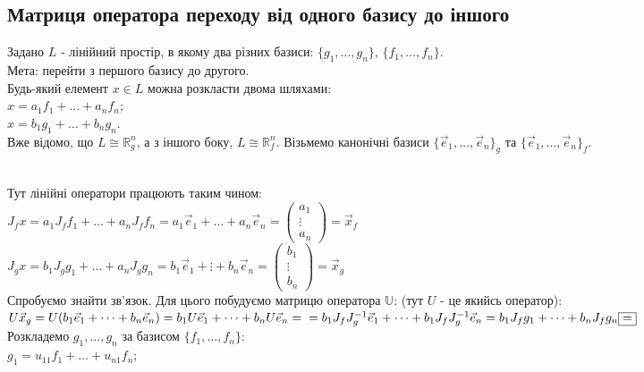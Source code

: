\documentclass[a4paper, 10pt]{article}
\theoremstyle{theoremdd}
\begin{document}
\subsection{Матриця оператора переходу від одного базису до іншого}
Задано $L$ - лінійний простір, в якому два різних базиси: $\{g_1,
\dots,g_n\}$, $\{f_1,\dots,f_n\}$. \\
Мета: перейти з першого базису до другого.\\
Будь-який елемент $x \in L$ можна розкласти двома шляхами:\\
$x = a_1 f_1 + \dots + a_n f_n$;\\
$x = b_1 g_1 + \dots + b_n g_n$.\\
Вже відомо, що $L \cong \mathbb{R}^n_g$, а з іншого боку, $L \cong \mathbb{R}^n_f$. Візьмемо канонічні базиси $\{\vec{e}_1,\dots, \vec{e}_n\}_g$ та $\{\vec{e}_1,\dots, \vec{e}_n\}_f$.
\\
\\
Тут лінійні оператори працюють таким чином:\\
$J_f x = a_1 J_f f_1 + \dots + a_n J_f f_n = a_1 \vec{e}_1 + \dots + a_n \vec{e}_n = \begin{pmatrix}
a_1 \\ \vdots \\ a_n
\end{pmatrix} = \vec{x}_f$\\
$J_g x = b_1 J_g g_1 + \dots + a_n J_g g_n = b_1 \vec{e}_1 + \vdots + b_n \vec{e}_n = \begin{pmatrix}
b_1 \\ \vdots \\ b_n
\end{pmatrix} = \vec{x}_g $\\
Спробуємо знайти зв'язок. Для цього побудуємо матрицю оператора $\mathbb{U}$: (тут $U$ - це якийсь оператор):\\
$U \vec{x}_g = U(b_1 \vec{e}_1 + \dots + b_n \vec{e}_n) = b_1 U\vec{e}_1 + \dots + b_n U\vec{e}_n = \\ = b_1 J_f J_g^{-1} \vec{e}_1 + \dots + b_1 J_f J_g^{-1} \vec{e}_n = b_1 J_f g_1 + \dots + b_n J_f g_n \boxed{=} $\\
Розкладемо $g_1,\dots,g_n$ за базисом $\{f_1,\dots, f_n\}$:\\
$g_1 = u_{11}f_1 + \dots + u_{n1}f_n$;\\
\end{document}
